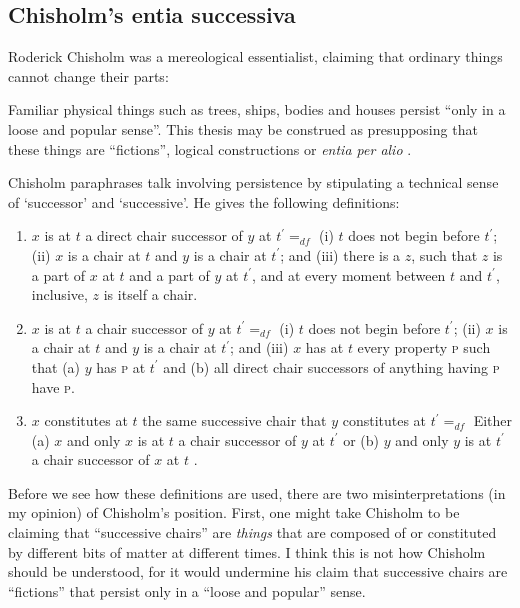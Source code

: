 \documentclass[12pt,twoside]{reedfancy}
\newenvironment{squote}{%
	\begin{spacing}{1}
	\begin{list}{}{%
	\setlength{\labelwidth}{0pt}%
	\rightmargin\leftmargin%
	}
	\item\relax
	}{%
	\end{list}%
	\end{spacing}
	}
\begin{document}
\begin{spacing}{1.25}
\subsection{Chisholm's entia successiva}
\label{chisholm}
Roderick Chisholm was a mereological essentialist, claiming that
ordinary things cannot change their parts:

\begin{squote}
Familiar physical things such as trees, ships, bodies and houses
persist ``only in a loose and popular sense''.  This thesis may be
construed as presupposing that these things are ``fictions'', logical
constructions or {\em entia per alio} \citeyearpar[97]{chisholm1979}.
\end{squote}

Chisholm paraphrases talk involving persistence by stipulating a
technical sense of `successor' and `successive'.  He gives the
following definitions:

\begin{enumerate}[ref=\arabic*]
  \item $x$ is at $t$ a direct chair successor of $y$ at $t^{\prime}
    =_{df}$ (i) $t$ does not begin before $t^{\prime}$; (ii) $x$ is a
    chair at $t$ and $y$ is a chair at $t^{\prime}$; and (iii) there
    is a $z$, such that $z$ is a part of $x$ at $t$ and a part of $y$
    at $t^{\prime}$, and at every moment between $t$ and $t^{\prime}$,
    inclusive, $z$ is itself a chair. \label{suc1}
  \item $x$ is at $t$ a chair successor of $y$ at $t^{\prime} =_{df}$
    (i) $t$ does not begin before $t^{\prime}$; (ii) $x$ is a chair at
    $t$ and $y$ is a chair at $t^{\prime}$; and (iii) $x$ has at $t$
    every property \textsc{p} such that (a) $y$ has \textsc{p} at
    $t^{\prime}$ and (b) all direct chair successors of anything
    having \textsc{p} have \textsc{p}. \label{suc2}
  \item $x$ constitutes at $t$ the same successive chair that $y$
    constitutes at $t^{\prime} =_{df}$ Either (a) $x$ and only $x$ is
    at $t$ a chair successor of $y$ at $t^{\prime}$ or (b) $y$ and
    only $y$ is at $t^{\prime}$ a chair successor of $x$ at $t$
    \citep[99--100]{chisholm1979}. \label{suc3}
\end{enumerate}

Before we see how these definitions are used, there are two
misinterpretations (in my opinion) of Chisholm's position.  First, one
might take Chisholm to be claiming that ``successive chairs'' are {\em
  things} that are composed of or constituted by different bits of
matter at different times.  I think this is not how Chisholm should be
understood, for it would undermine his claim that successive chairs
are ``fictions'' that persist only in a ``loose and popular'' sense.


\end{spacing}
\end{document}
